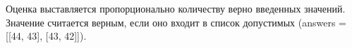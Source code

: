 \markSection

Оценка выставляется пропорционально количеству верно введенных значений. Значение считается верным, если оно входит в список допустимых (answers = [[44, 43], [43, 42]]). 

